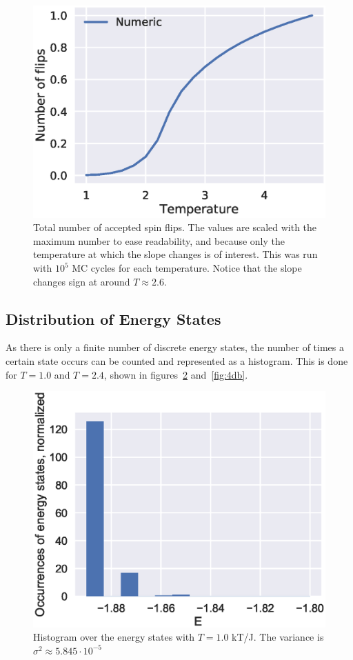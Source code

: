 \documentclass[aps,reprint]{revtex4-1}
\begin{document}
\begin{figure}[H]
  \includegraphics[width=\columnwidth]{figures/4c_number_of_flips.eps}
  \caption{Total number of accepted spin flips. The values are scaled with the
  maximum number to ease readability, and because only the temperature at which the
  slope changes is of interest. This was run with $10^5$ MC
  cycles for each temperature. Notice that the slope changes sign at around
  $T \approx 2.6$.}
  \label{fig:4cFlips}
\end{figure}

\subsection{Distribution of Energy States}
\label{sec:distr-energy-stat}

As there is only a finite number of discrete energy states, the number of
times a certain state occurs can be counted and represented as a histogram. This
is done for \(T=1.0\) and \(T=2.4\), shown in figures~\ref{fig:4da}
and~\ref{fig:4db}.
\begin{figure}[H]
  \centering
  \includegraphics[width=\columnwidth]{figures/4da.eps}
  \caption{\label{fig:4da} Histogram over the energy states with \(T=1.0\) kT/J.
  The variance is \(\sigma^{2} \approx 5.845\cdot 10^{-5}\)}
\end{figure}
\end{document}
